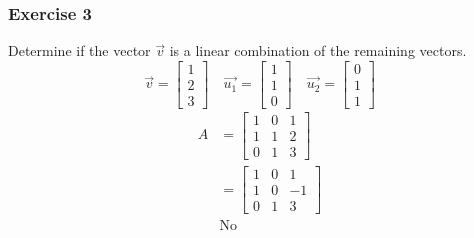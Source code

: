 \documentclass{math}
\begin{document}
\subsubsection*{Exercise 3}
Determine if the vector \( \vec{v} \) is a linear combination of the remaining
vectors.
\[ \vec{v} = \begin{bmatrix}1 \\ 2 \\ 3\end{bmatrix} \quad
  \vec{u_1} = \begin{bmatrix}1 \\ 1 \\ 0\end{bmatrix} \quad
  \vec{u_2} = \begin{bmatrix}0 \\ 1 \\ 1\end{bmatrix} \]
\begin{align*}
  A &= \begin{bmatrix}
    1 & 0 & 1 \\
    1 & 1 & 2 \\
    0 & 1 & 3
  \end{bmatrix} \\
  &= \begin{bmatrix}
    1 & 0 & 1 \\
    1 & 0 & -1 \\
    0 & 1 & 3
  \end{bmatrix} \\
  & \text{No}
\end{align*}
\end{document}
